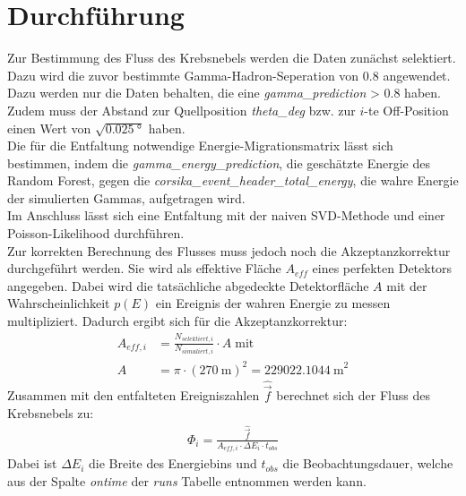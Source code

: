 \section{Durchführung}
Zur Bestimmung des Fluss des Krebsnebels werden die Daten zunächst selektiert. Dazu wird die zuvor bestimmte Gamma-Hadron-Seperation von $0.8$ angewendet. Dazu werden nur die Daten behalten, die eine \textit{gamma\_prediction} \textgreater \; $0.8$ haben. Zudem muss der Abstand zur Quellposition \textit{theta\_deg} bzw. zur $i$-te Off-Position einen Wert von $\sqrt{\SI{0.025}{\degree}}$ haben.\\
Die für die Entfaltung notwendige Energie-Migrationsmatrix lässt sich bestimmen, indem die \textit{gamma\_energy\_prediction}, die geschätzte Energie des Random Forest, gegen die \textit{corsika\_event\_header\_total\_energy}, die wahre Energie der simulierten Gammas, aufgetragen wird.\\
Im Anschluss lässt sich eine Entfaltung mit der naiven SVD-Methode und einer Poisson-Likelihood durchführen.\\
Zur korrekten Berechnung des Flusses muss jedoch noch die Akzeptanzkorrektur durchgeführt werden. Sie wird als effektive Fläche $A_{eff}$ eines perfekten Detektors angegeben. Dabei wird die tatsächliche abgedeckte Detektorfläche $A$ mit der Wahrscheinlichkeit $p(E)$ ein Ereignis der wahren Energie zu messen multipliziert. Dadurch ergibt sich für die Akzeptanzkorrektur:\\
\begin{align}
	A_{eff,i} &= \frac{N_{selektiert,i}}{N_{simuliert,i}} \cdot A \; \text{mit}\\
	A &= \pi \cdot (\SI{270}{\meter})^2 = \SI{229022.1044}{\meter}^2
\end{align}
Zusammen mit den entfalteten Ereigniszahlen $\hat{\vec{f}}$ berechnet sich der Fluss des Krebsnebels zu:
\begin{align}
	\Phi_{i} = \frac{\hat{\vec{f}}}{A_{eff,i} \cdot \Delta E_{i} \cdot t_{obs}}
\end{align}
Dabei ist $\Delta E_{i}$ die Breite des Energiebins und $t_{obs}$ die Beobachtungsdauer, welche aus der Spalte \textit{ontime} der \textit{runs} Tabelle entnommen werden kann.
